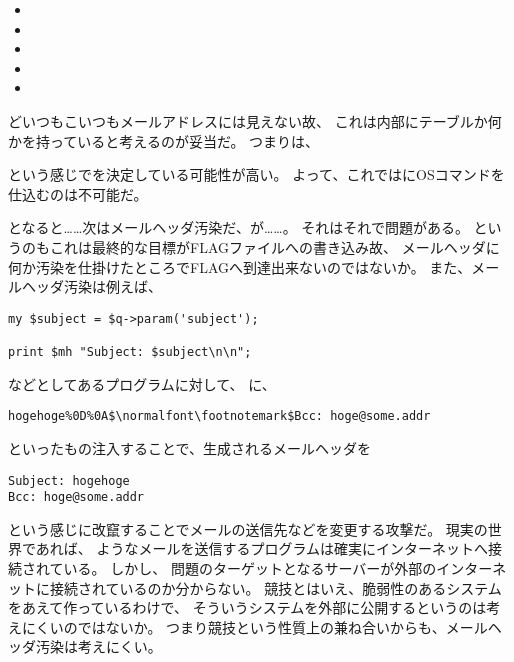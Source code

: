 \begin{itemize}
	\item {}
	\item {}
	\item {}
	\item {}
	\item {}
\end{itemize}

どいつもこいつもメールアドレスには見えない故、
これは内部にテーブルか何かを持っていると考えるのが妥当だ。
つまりは、



という感じでを決定している可能性が高い。
よって、これではにOSコマンドを仕込むのは不可能だ。

となると……次はメールヘッダ汚染だ、が……。
それはそれで問題がある。
というのもこれは最終的な目標がFLAGファイルへの書き込み故、
メールヘッダに何か汚染を仕掛けたところでFLAGへ到達出来ないのではないか。
また、メールヘッダ汚染は例えば、

\begin{lstlisting}[style=perl]
my $subject = $q->param('subject');

print $mh "Subject: $subject\n\n";
\end{lstlisting}

などとしてあるプログラムに対して、
に、

\begin{lstlisting}[mathescape]
hogehoge%0D%0A$\normalfont\footnotemark$Bcc: hoge@some.addr
\end{lstlisting}

といったもの注入することで、生成されるメールヘッダを

\begin{lstlisting}
Subject: hogehoge
Bcc: hoge@some.addr
\end{lstlisting}

という感じに改竄することでメールの送信先などを変更する攻撃だ。
現実の世界であれば、
ようなメールを送信するプログラムは確実にインターネットへ接続されている。
しかし、
問題のターゲットとなるサーバーが外部のインターネットに接続されているのか分からない。
競技とはいえ、脆弱性のあるシステムをあえて作っているわけで、
そういうシステムを外部に公開するというのは考えにくいのではないか。
つまり競技という性質上の兼ね合いからも、メールヘッダ汚染は考えにくい。

